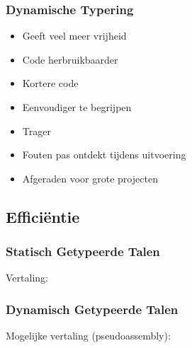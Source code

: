 \begin{frame}
  \frametitle{Dynamische Typering}
  \begin{itemize}
    \item Geeft veel meer vrijheid
    \item Code herbruikbaarder
    \item Kortere code
    \item Eenvoudiger te begrijpen
  \end{itemize}
  \vskip5mm
  \begin{itemize}
    \item Trager
    \item Fouten pas ontdekt tijdens uitvoering
    \item Afgeraden voor grote projecten
  \end{itemize}
\end{frame}

\subsection{Effici\"entie}

\frame{\tableofcontents[currentsubsection]}

\begin{frame}
  \frametitle{Statisch Getypeerde Talen}
  Vertaling:
\end{frame}

\begin{frame}
  \frametitle{Dynamisch Getypeerde Talen}
  Mogelijke vertaling (pseudoassembly):
\end{frame}


